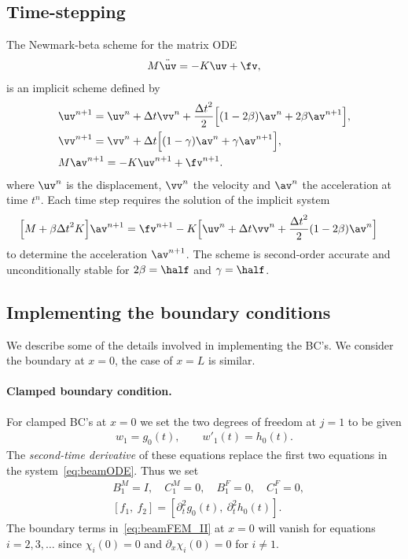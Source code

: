 \documentclass[11pt]{article}
\newcommand{\dt}{{\Delta t}}
\begin{document}
\subsection{Time-stepping}
The Newmark-beta scheme for the matrix ODE 
\begin{align*}
   M \ddot\uv = - K \uv + \fv ,
\end{align*}
is an implicit scheme defined by
\begin{align*}
 &  \uv^{n+1} = \uv^n + \dt\vv^n + \frac{\dt^2}{2}\Big[ (1-2\beta) \av^n + 2\beta \av^{n+1} \Big],  \\
 &  \vv^{n+1} = \vv^n + \dt\Big[  (1-\gamma) \av^n + \gamma \av^{n+1} \Big]    , \\
 &  M \av^{n+1} =  -K \uv^{n+1} + \fv^{n+1} .
\end{align*}
where $\uv^n$ is the displacement, $\vv^n$ the velocity and $\av^n$ the acceleration at time $t^n$. 
Each time step requires the solution of the implicit system
\begin{align}
 &  \Big[ M +\beta\dt^2 K \Big] \av^{n+1} = \fv^{n+1} - K\Big[ \uv^n + \dt\vv^n + \frac{\dt^2}{2} (1-2\beta) \av^n \Big] 
   \label{eq:NewmarkMatrix}
\end{align}
to determine the acceleration $\av^{n+1}$. 
The scheme is second-order accurate and unconditionally stable for $2\beta=\half$ and $\gamma=\half$. 

\subsection{Implementing the boundary conditions} \label{eq:BeamModel_FEM_BC}

We describe some of the details involved in implementing the BC's. We consider the 
boundary at $x=0$, the case of $x=L$ is similar. 

\paragraph{Clamped boundary condition.} For clamped BC's at $x=0$ we set the two degrees of
freedom at $j=1$ to be given
\begin{align}
  w_1 = g_0(t), \qquad w'_1(t)=h_0(t).
\end{align}
The {\em second-time derivative} of these equations replace the first two equations in the system~\eqref{eq:beamODE}. 
Thus we set 
\begin{align*}
&  B_1^M=I, \quad C_1^M=0, \quad B^F_1=0, \quad C^F_1=0 , \\
&  [f_1, ~f_2]=[\partial_t^2g_0(t), ~\partial_t^2 h_0(t)].
\end{align*}
The boundary terms in~\eqref{eq:beamFEM_II} at $x=0$ will vanish for equations $i=2,3,\ldots$ 
since $\chi_i(0)=0$ and $\partial_x\chi_i(0)=0$
for $i\ne 1$.
\end{document}
